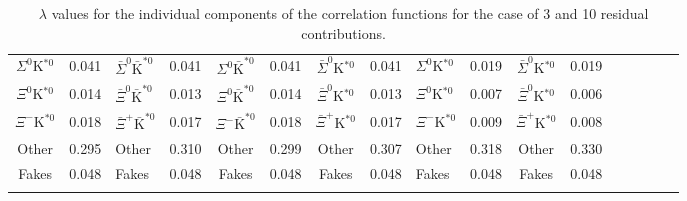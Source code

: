 \documentclass[/home/jesse/Analysis/FemtoAnalysis/AnalysisNotes/AnalysisNoteJBuxton.tex]{subfiles}
\begin{document}
\begin{landscape}
\begin{table}[htbp]
{\begin{tabular}{|c|cV{5.0}c|cV{5.0}c|cV{5.0}c|cV{5.0}c|cV{5.0}c|c|}
  $\Sigma^{0}$K$^{*0}$ & 0.041 & $\bar{\Sigma}^{0}\bar{\mathrm{K}}^{*0}$ & 0.041 & $\Sigma^{0}\bar{\mathrm{K}}^{*0}$ & 0.041 & $\bar{\Sigma}^{0}$K$^{*0}$ & 0.041 & $\Sigma^{0}$K$^{*0}$ & 0.019 & $\bar{\Sigma}^{0}$K$^{*0}$ & 0.019 \\
  
  $\Xi^{0}$K$^{*0}$ & 0.014 & $\bar{\Xi}^{0}\bar{\mathrm{K}}^{*0}$ & 0.013 & $\Xi^{0}\bar{\mathrm{K}}^{*0}$ & 0.014 & $\bar{\Xi}^{0}$K$^{*0}$ & 0.013 & $\Xi^{0}$K$^{*0}$ & 0.007 & $\bar{\Xi}^{0}$K$^{*0}$ & 0.006 \\
  
  $\Xi^{-}$K$^{*0}$ & 0.018 & $\bar{\Xi}^{+}\bar{\mathrm{K}}^{*0}$ & 0.017 & $\Xi^{-}\bar{\mathrm{K}}^{*0}$ & 0.018 & $\bar{\Xi}^{+}$K$^{*0}$ & 0.017 & $\Xi^{-}$K$^{*0}$ & 0.009 & $\bar{\Xi}^{+}$K$^{*0}$ & 0.008 \\
  
  Other & 0.295 & Other & 0.310 & Other & 0.299 & Other & 0.307 & Other & 0.318 & Other & 0.330 \\
  
  Fakes & 0.048 & Fakes & 0.048 & Fakes & 0.048 & Fakes & 0.048 & Fakes & 0.048 & Fakes & 0.048 \\
  
 \end{tabular}}
 \caption{$\lambda$ values for the individual components of the \LamK correlation functions for the case of 3 and 10 residual contributions.}
 \label{tab:LambdaValues_All}
\end{table}

\end{landscape}
\pagestyle{plain}
\end{document}

